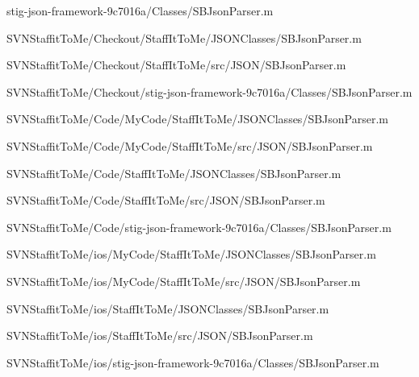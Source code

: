 \begin{DoxyCompactItemize}
stig-\/json-\/framework-\/9c7016a/\-Classes/\-S\-B\-Json\-Parser.\-m\item 
\-S\-V\-N\-Staffit\-To\-Me/\-Checkout/\-Staff\-It\-To\-Me/\-J\-S\-O\-N\-Classes/\-S\-B\-Json\-Parser.\-m\item 
\-S\-V\-N\-Staffit\-To\-Me/\-Checkout/\-Staff\-It\-To\-Me/src/\-J\-S\-O\-N/\-S\-B\-Json\-Parser.\-m\item 
\-S\-V\-N\-Staffit\-To\-Me/\-Checkout/stig-\/json-\/framework-\/9c7016a/\-Classes/\-S\-B\-Json\-Parser.\-m\item 
\-S\-V\-N\-Staffit\-To\-Me/\-Code/\-My\-Code/\-Staff\-It\-To\-Me/\-J\-S\-O\-N\-Classes/\-S\-B\-Json\-Parser.\-m\item 
\-S\-V\-N\-Staffit\-To\-Me/\-Code/\-My\-Code/\-Staff\-It\-To\-Me/src/\-J\-S\-O\-N/\-S\-B\-Json\-Parser.\-m\item 
\-S\-V\-N\-Staffit\-To\-Me/\-Code/\-Staff\-It\-To\-Me/\-J\-S\-O\-N\-Classes/\-S\-B\-Json\-Parser.\-m\item 
\-S\-V\-N\-Staffit\-To\-Me/\-Code/\-Staff\-It\-To\-Me/src/\-J\-S\-O\-N/\-S\-B\-Json\-Parser.\-m\item 
\-S\-V\-N\-Staffit\-To\-Me/\-Code/stig-\/json-\/framework-\/9c7016a/\-Classes/\-S\-B\-Json\-Parser.\-m\item 
\-S\-V\-N\-Staffit\-To\-Me/ios/\-My\-Code/\-Staff\-It\-To\-Me/\-J\-S\-O\-N\-Classes/\-S\-B\-Json\-Parser.\-m\item 
\-S\-V\-N\-Staffit\-To\-Me/ios/\-My\-Code/\-Staff\-It\-To\-Me/src/\-J\-S\-O\-N/\-S\-B\-Json\-Parser.\-m\item 
\-S\-V\-N\-Staffit\-To\-Me/ios/\-Staff\-It\-To\-Me/\-J\-S\-O\-N\-Classes/\-S\-B\-Json\-Parser.\-m\item 
\-S\-V\-N\-Staffit\-To\-Me/ios/\-Staff\-It\-To\-Me/src/\-J\-S\-O\-N/\-S\-B\-Json\-Parser.\-m\item 
\-S\-V\-N\-Staffit\-To\-Me/ios/stig-\/json-\/framework-\/9c7016a/\-Classes/\-S\-B\-Json\-Parser.\-m\end{DoxyCompactItemize}
